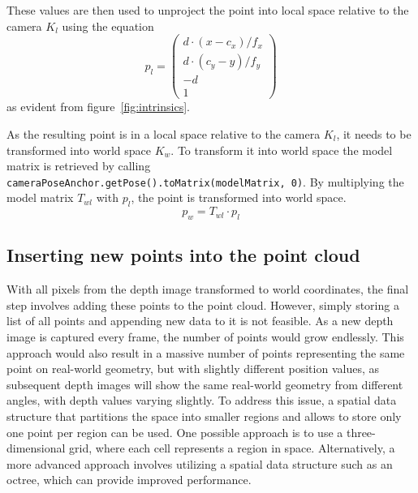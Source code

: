 These values are then used to unproject the point into local space relative to the camera $K_l$ using the equation
\begin{equation}
    p_l = \begin{pmatrix}
              d \cdot (x - c_x) / f_x \\
              d \cdot (c_y - y) / f_y \\
              -d                      \\
              1
    \end{pmatrix}
\end{equation}
as evident from figure~\ref{fig:intrinsics}.

As the resulting point is in a local space relative to the camera $K_l$, it needs to be transformed into world space $K_w$.
To transform it into world space the model matrix is retrieved by calling
\texttt{cameraPoseAnchor.getPose().toMatrix(modelMatrix, 0)}.
By multiplying the model matrix $T_{wl}$ with $p_l$, the point is transformed into world space.
\begin{equation}
    p_w = T_{wl} \cdot p_l
\end{equation}

\subsection{Inserting new points into the point cloud}

With all pixels from the depth image transformed to world coordinates, the final step involves adding these points to the point cloud.
However, simply storing a list of all points and appending new data to it is not feasible.
As a new depth image is captured every frame, the number of points would grow endlessly.
This approach would also result in a massive number of points representing the same point on real-world geometry,
but with slightly different position values,
as subsequent depth images will show the same real-world geometry from different angles, with depth values varying slightly.
To address this issue, a spatial data structure that partitions the space into smaller regions and
allows to store only one point per region can be used.
One possible approach is to use a three-dimensional grid, where each cell represents a region in space.
Alternatively, a more advanced approach involves utilizing a spatial data structure such as an octree,
which can provide improved performance.

